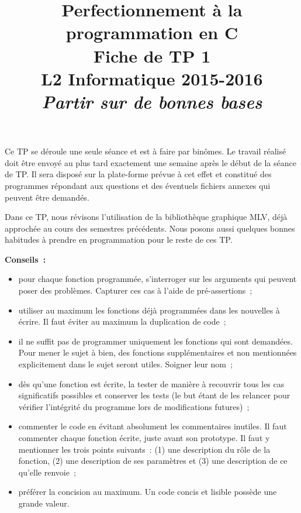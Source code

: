 \documentclass[12pt]{article}
\date{}
\title{{\bf Perfectionnement à la programmation en {\sf C}} \\
    Fiche de TP 1 \\
    {\small L2 Informatique 2015-2016} \\
    {\it \small Partir sur de bonnes bases}}
\theoremstyle{definition}
\begin{document}
\maketitle

Ce TP se déroule une seule séance et est à faire par binômes.
Le travail réalisé doit être envoyé au plus tard exactement une
semaine après le début de la séance de TP. Il sera disposé sur
la plate-forme prévue à cet effet et constitué des programmes
répondant aux questions et des éventuels fichiers annexes qui
peuvent être demandés.
\bigskip
\bigskip

Dans ce TP, nous révisons l'utilisation de la bibliothèque graphique
{\sf MLV}, déjà approchée au cours des semestres précédents. Nous posons 
aussi quelques bonnes habitudes à prendre en programmation pour le reste 
de ces TP.
\bigskip
\bigskip

{\bf Conseils~:}
\begin{itemize}
    \item pour chaque fonction programmée, s'interroger sur les arguments
    qui peuvent poser des problèmes. Capturer ces cas à l'aide de
    pré-assertions~;
    \item utiliser au maximum les fonctions déjà programmées dans les
    nouvelles à écrire. Il faut éviter au maximum la duplication de code~;
    \item il ne suffit pas de programmer uniquement les fonctions qui sont
    demandées. Pour mener le sujet à bien, des fonctions supplémentaires
    et non mentionnées explicitement dans le sujet seront utiles. Soigner
    leur nom~;
    \item dès qu'une fonction est écrite, la tester de manière à
    recouvrir tous les cas significatifs possibles et conserver les tests
    (le but étant de les relancer pour vérifier l'intégrité du
    programme lors de modifications futures)~;
    \item commenter le code en évitant absolument les commentaires inutiles.
    Il faut commenter chaque fonction écrite, juste avant son prototype.
    Il faut y mentionner les trois points suivants~: (1) une description
    du rôle de la fonction, (2) une description de ses paramètres et (3)
    une description de ce qu'elle renvoie~;
    \item préférer la concision au maximum. Un code concis et lisible
    possède une grande valeur.
\end{itemize}
\bigskip
\bigskip
\end{document}
